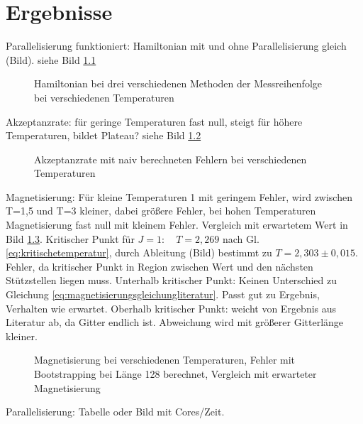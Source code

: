 \documentclass{scrreprt}
\begin{document}
	
	 	
	\chapter{Ergebnisse}
	Parallelisierung funktioniert: Hamiltonian mit und ohne Parallelisierung gleich (Bild). siehe Bild \ref{fig:vergleichham}
	
	\begin{figure}[htbp]
		
		\label{fig:vergleichham}
		\caption{Hamiltonian bei drei verschiedenen Methoden der Messreihenfolge bei verschiedenen Temperaturen}
	\end{figure}
	Akzeptanzrate: für geringe Temperaturen fast null, steigt für höhere Temperaturen, bildet Plateau? siehe Bild \ref{fig:akzeptanzratenaiv}
	
	\begin{figure}[htbp]
		
		\label{fig:akzeptanzratenaiv}
		\caption{Akzeptanzrate mit naiv berechneten Fehlern bei verschiedenen Temperaturen}
	\end{figure}
	
	Magnetisierung: Für kleine Temperaturen 1 mit geringem Fehler, wird zwischen T=1,5 und T=3 kleiner, dabei größere Fehler, bei hohen Temperaturen Magnetisierung fast null mit kleinem Fehler. Vergleich mit erwartetem Wert in Bild \ref{fig:magnetisierungbootstrap-l-128}.
	Kritischer Punkt für ${J=1:}\quad {T=2,269}$ nach Gl. \ref{eq:kritischetemperatur}, durch Ableitung (Bild) bestimmt zu $T=2,303\pm0,015$. Fehler, da kritischer Punkt in Region zwischen Wert und den nächsten Stützstellen liegen muss.
	Unterhalb kritischer Punkt: Keinen Unterschied zu Gleichung \ref{eq:magnetisierungsgleichungliteratur}. Passt gut zu Ergebnis, Verhalten wie erwartet.
	Oberhalb kritischer Punkt: weicht von Ergebnis aus Literatur ab, da Gitter endlich ist. Abweichung wird mit größerer Gitterlänge kleiner.
	
	
	\begin{figure}[htbp]
		
		\label{fig:magnetisierungbootstrap-l-128}
		\caption{Magnetisierung bei verschiedenen Temperaturen, Fehler mit Bootstrapping bei Länge 128 berechnet, Vergleich mit erwarteter Magnetisierung}
	\end{figure}
		
	Parallelisierung: Tabelle oder Bild mit Cores/Zeit.
	\listoffigures
	
	
	
	\printbibliography[heading=bibintoc]
\end{document}
